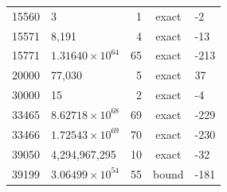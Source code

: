 \begin{tabular}{rlrcl}
15560 & 3 & 1 & exact & -2 \\
15571 & 8{,}191 & 4 & exact & -13 \\
15771 & $1.31640\times 10^{64}$ & 65 & exact & -213 \\
20000 & 77{,}030 & 5 & exact & 37 \\
30000 & 15 & 2 & exact & -4 \\
33465 & $8.62718\times 10^{68}$ & 69 & exact & -229 \\
33466 & $1.72543\times 10^{69}$ & 70 & exact & -230 \\
39050 & 4{,}294{,}967{,}295 & 10 & exact & -32 \\
39199 & $3.06499\times 10^{54}$ & 55 & bound & -181 \\
\bottomrule
\end{tabular}
